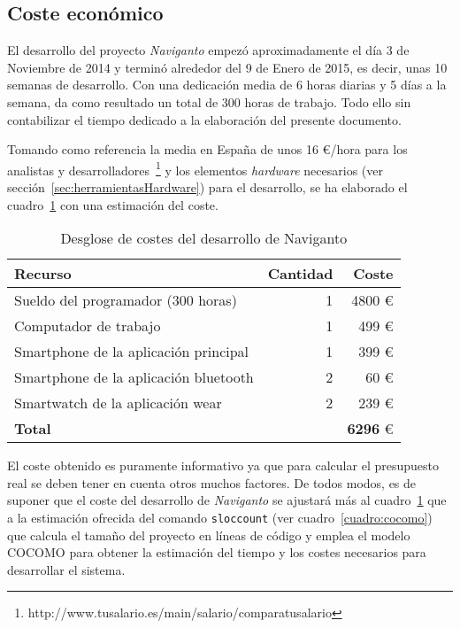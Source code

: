 \subsection{Coste económico}

El desarrollo del proyecto \emph{Naviganto} empezó aproximadamente el día 3 de Noviembre de 2014 y
terminó alrededor del 9 de Enero de 2015, es decir, unas 10 semanas de desarrollo. Con una
dedicación media de 6 horas diarias y 5 días a la semana, da como resultado un total de 300 horas de
trabajo. Todo ello sin contabilizar el tiempo dedicado a la elaboración del presente documento.

Tomando como referencia la media en España de unos 16 \euro/hora para los analistas y
desarrolladores~\footnote{http://www.tusalario.es/main/salario/comparatusalario} y los elementos
\emph{hardware} necesarios (ver sección~\ref{sec:herramientasHardware}) para el desarrollo, se ha
elaborado el cuadro~\ref{cuadro:costes} con una estimación del coste.

\begin{table}[h]
  \centering
  \begin{tabular}{|l|r|r|}
    \hline
    \textbf{Recurso} & \textbf{Cantidad} & \textbf{Coste} \\
    \hline
    Sueldo del programador (300 horas)     & 1 &          4800 \euro \\
    \hline
    Computador de trabajo                  & 1 &           499 \euro \\
    \hline
    Smartphone de la aplicación principal  & 1 &           399 \euro \\
    \hline
    Smartphone de la aplicación bluetooth  & 2 &            60 \euro \\
    \hline
    Smartwatch de la aplicación wear       & 2 &           239 \euro \\
    \hline
    \textbf{Total}                         &   & \textbf{6296} \euro \\
    \hline
  \end{tabular}
  \caption{Desglose de costes del desarrollo de Naviganto}
  \label{cuadro:costes}
\end{table}

El coste obtenido es puramente informativo ya que para calcular el presupuesto real se deben tener
en cuenta otros muchos factores. De todos modos, es de suponer que el coste del desarrollo de
\emph{Naviganto} se ajustará más al cuadro~\ref{cuadro:costes} que a la estimación ofrecida del
comando \texttt{sloccount} (ver cuadro~\ref{cuadro:cocomo}) que calcula el tamaño del proyecto en
líneas de código y emplea el modelo \acf{COCOMO} para obtener la estimación del tiempo y los costes
necesarios para desarrollar el sistema.

